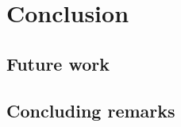 \chapter{Conclusion}  \label{chapter:conclusion}


\section{Future work}

\section{Concluding remarks}

